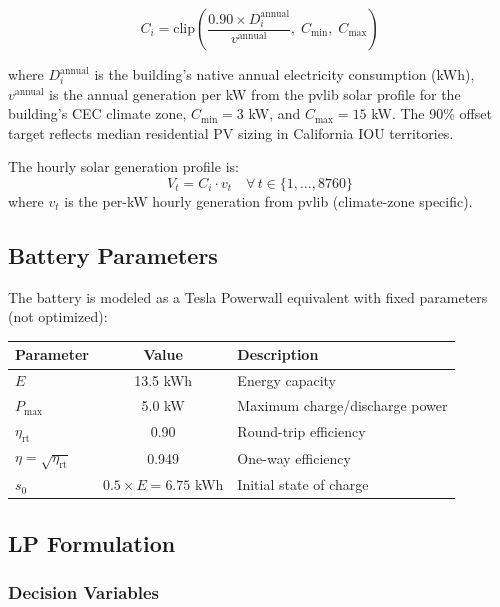 \documentclass[11pt]{article}
\begin{document}
\begin{equation}
    C_i = \text{clip}\!\left(\frac{0.90 \times D_i^{\text{annual}}}{v^{\text{annual}}},\; C_{\min},\; C_{\max}\right)
\end{equation}

where $D_i^{\text{annual}}$ is the building's native annual electricity consumption (kWh), $v^{\text{annual}}$ is the annual generation per kW from the pvlib solar profile for the building's CEC climate zone, $C_{\min} = 3$ kW, and $C_{\max} = 15$ kW. The 90\% offset target reflects median residential PV sizing in California IOU territories.

The hourly solar generation profile is:
\begin{equation}
    V_t = C_i \cdot v_t \quad \forall \, t \in \{1, \ldots, 8760\}
\end{equation}
where $v_t$ is the per-kW hourly generation from pvlib (climate-zone specific).

\subsection{Battery Parameters}

The battery is modeled as a Tesla Powerwall equivalent with fixed parameters (not optimized):

\begin{table}[htbp]
\centering
\begin{tabular}{l c l}
\toprule
\textbf{Parameter} & \textbf{Value} & \textbf{Description} \\
\midrule
$E$ & 13.5 kWh & Energy capacity \\
$P_{\max}$ & 5.0 kW & Maximum charge/discharge power \\
$\eta_{\text{rt}}$ & 0.90 & Round-trip efficiency \\
$\eta = \sqrt{\eta_{\text{rt}}}$ & 0.949 & One-way efficiency \\
$s_0$ & $0.5 \times E = 6.75$ kWh & Initial state of charge \\
\bottomrule
\end{tabular}
\end{table}

\subsection{LP Formulation}

\subsubsection{Decision Variables}
\end{document}
